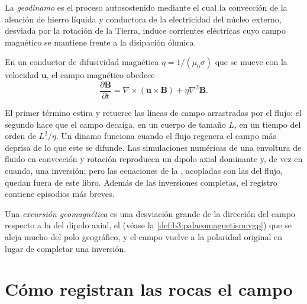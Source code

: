 \begin{definition}[Geodinamo]\label{def:b3:palaeomagnetism:geodynamo}
La \emph{geodinamo} es el proceso autosostenido mediante el cual
la convección de la aleación de hierro líquida y conductora de la electricidad del núcleo
externo, desviada por la rotación de la Tierra, induce corrientes eléctricas cuyo
campo magnético se mantiene frente a la disipación óhmica.
\end{definition}

\begin{proposition}\label{prop:b3:palaeomagnetism:induction}
En un conductor de difusividad magnética $\eta = 1/(\mu_0\sigma)$ que se mueve con la
velocidad $\mathbf u$, el campo magnético obedece
\[
  \frac{\partial\mathbf B}{\partial t} = \nabla\times(\mathbf u\times\mathbf B)
  + \eta\nabla^2\mathbf B .
\]
\end{proposition}
\admitted

El primer término estira y retuerce las líneas de campo arrastradas por el flujo; el
segundo hace que el campo decaiga, en un cuerpo de tamaño $L$, en un tiempo del orden de
$L^2/\eta$. Un dinamo funciona cuando el flujo regenera el campo más deprisa de lo que este
se difunde. Las simulaciones numéricas de una envoltura de fluido en convección y rotación
reproducen un dipolo axial dominante y, de vez en cuando, una inversión; pero las
ecuaciones de la , acopladas con las del flujo, quedan fuera de este
libro. Además de las inversiones completas, el registro contiene episodios más breves.

\begin{definition}\label{def:b3:palaeomagnetism:excursion}
Una \emph{excursión geomagnética} es una desviación grande
de la dirección del campo respecto a la del dipolo axial, el
 (véase la \cref{def:b3:palaeomagnetism:vgp}) que se aleja mucho del
polo geográfico, y el campo vuelve a la polaridad original en lugar de
completar una inversión.
\end{definition}

\section{Cómo registran las rocas el campo}

